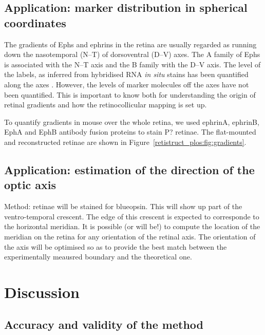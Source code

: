 \documentclass[10pt]{article}
\begin{document}
\subsection*{Application: marker distribution in spherical coordinates}

The gradients of Ephs and ephrins in the retina are usually regarded
as running down the nasotemporal (N--T) of dorsoventral (D--V)
axes. The A family of Ephs is associated with the N--T axis and the B
family with the D--V axis. The level of the labels, as inferred from
hybridised RNA \emph{in situ} stains has been quantified along the
axes \cite{ChenEtal95comp,RebeEtal04rela}.  However, the levels of
marker molecules off the axes have not been quantified. This is
important to know both for understanding the origin of retinal
gradients and how the retinocollicular mapping is set up. 

To quantify gradients in mouse over the whole retina, we used ephrinA,
ephrinB, EphA and EphB antibody fusion proteins to stain P?
retinae. The flat-mounted and reconstructed retinae are shown in
Figure~\ref{retistruct_plos:fig:gradients}.

\subsection*{Application: estimation of the direction of the optic axis}
\label{retistruct_plos:sec:appl-estim-direct}

Method: retinae will be stained for blueopsin. This will show up part
of the ventro-temporal crescent. The edge of this crescent is expected
to corresponde to the horizontal meridian. It is possible (or will
be!) to compute the location of the meridian on the retina for any
orientation of the retinal axis.  The orientation of the axis will be
optimised so as to provide the best match between the experimentally
meausred boundary and the theoretical one.


\section*{Discussion}

\subsection*{Accuracy and validity of the method}
\end{document}
